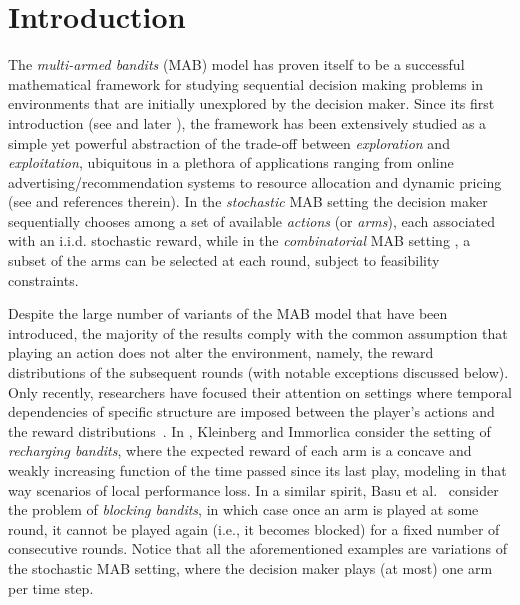 \section{Introduction}
The {\em multi-armed bandits} (MAB) model has proven itself to be a successful mathematical framework for studying sequential decision making problems in environments that are initially unexplored by the decision maker. Since its first introduction (see \cite{T33} and later \cite{LR85}), the framework has been extensively studied as a simple yet powerful abstraction of the trade-off between {\em exploration} and {\em exploitation}, ubiquitous in a plethora of applications ranging from online advertising/recommendation systems to resource allocation and dynamic pricing (see \cite{BB12,LS18} and references therein). In the {\em stochastic} MAB setting \cite{LR85} the decision maker sequentially chooses among a set of available {\em actions} (or {\em arms}), each associated with an i.i.d. stochastic reward, while in the {\em combinatorial} MAB setting \cite{CBL12}, a subset of the arms can be selected at each round, subject to feasibility constraints.

Despite the large number of variants of the MAB model that have been introduced, the majority of the results comply with the common assumption that playing an action does not alter the environment, namely, the reward distributions of the subsequent rounds (with notable exceptions discussed below). Only recently, researchers have focused their attention on settings where temporal dependencies of specific structure are imposed between the player's actions and the reward distributions~\cite{KI18, CCB19,BSSS19, PBG19,BPCS20}. In \cite{KI18}, Kleinberg and Immorlica consider the setting of {\em recharging bandits}, where the expected reward of each arm is a concave and weakly increasing function of the time passed since its last play, modeling in that way scenarios of local performance loss. 
In a similar spirit, Basu et al.\ \cite{BSSS19} consider the problem of {\em blocking bandits}, in which case once an arm is played at some round, it cannot be played again (i.e., it becomes blocked) for a fixed number of consecutive rounds. Notice that all the aforementioned examples are variations of the stochastic MAB setting, where the decision maker plays (at most) one arm per time step.

